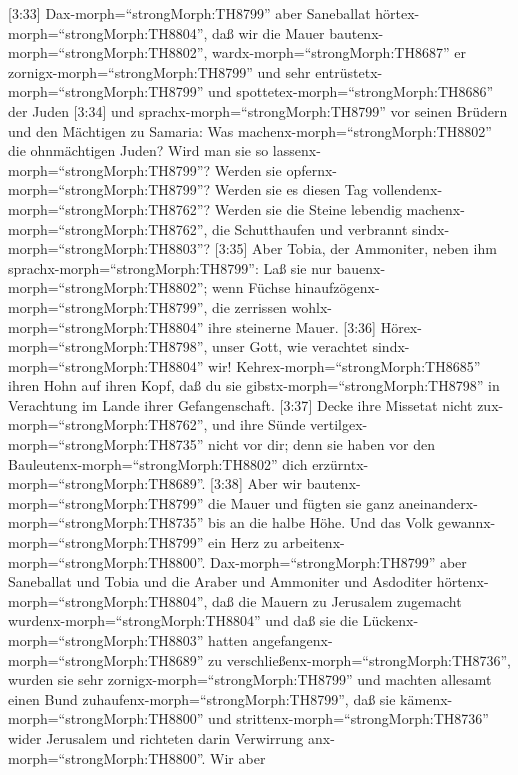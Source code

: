  {[}3:33{]} Dax-morph=``strongMorph:TH8799'' aber Saneballat
hörtex-morph=``strongMorph:TH8804'', daß wir die Mauer
bautenx-morph=``strongMorph:TH8802'', wardx-morph=``strongMorph:TH8687''
er zornigx-morph=``strongMorph:TH8799'' und sehr
entrüstetx-morph=``strongMorph:TH8799'' und
spottetex-morph=``strongMorph:TH8686'' der Juden  {[}3:34{]}
und sprachx-morph=``strongMorph:TH8799'' vor seinen Brüdern und den
Mächtigen zu Samaria: Was machenx-morph=``strongMorph:TH8802'' die
ohnmächtigen Juden? Wird man sie so
lassenx-morph=``strongMorph:TH8799''? Werden sie
opfernx-morph=``strongMorph:TH8799''? Werden sie es diesen Tag
vollendenx-morph=``strongMorph:TH8762''? Werden sie die Steine lebendig
machenx-morph=``strongMorph:TH8762'', die Schutthaufen und verbrannt
sindx-morph=``strongMorph:TH8803''?  {[}3:35{]} Aber Tobia,
der Ammoniter, neben ihm sprachx-morph=``strongMorph:TH8799'': Laß sie
nur bauenx-morph=``strongMorph:TH8802''; wenn Füchse
hinaufzögenx-morph=``strongMorph:TH8799'', die zerrissen
wohlx-morph=``strongMorph:TH8804'' ihre steinerne Mauer. 
{[}3:36{]} Hörex-morph=``strongMorph:TH8798'', unser Gott, wie verachtet
sindx-morph=``strongMorph:TH8804'' wir!
Kehrex-morph=``strongMorph:TH8685'' ihren Hohn auf ihren Kopf, daß du
sie gibstx-morph=``strongMorph:TH8798'' in Verachtung im Lande ihrer
Gefangenschaft.  {[}3:37{]} Decke ihre Missetat nicht
zux-morph=``strongMorph:TH8762'', und ihre Sünde
vertilgex-morph=``strongMorph:TH8735'' nicht vor dir; denn sie haben vor
den Bauleutenx-morph=``strongMorph:TH8802'' dich
erzürntx-morph=``strongMorph:TH8689''.  {[}3:38{]} Aber wir
bautenx-morph=``strongMorph:TH8799'' die Mauer und fügten sie ganz
aneinanderx-morph=``strongMorph:TH8735'' bis an die halbe Höhe. Und das
Volk gewannx-morph=``strongMorph:TH8799'' ein Herz zu
arbeitenx-morph=``strongMorph:TH8800''. 
Dax-morph=``strongMorph:TH8799'' aber Saneballat und Tobia und die
Araber und Ammoniter und Asdoditer hörtenx-morph=``strongMorph:TH8804'',
daß die Mauern zu Jerusalem zugemacht
wurdenx-morph=``strongMorph:TH8804'' und daß sie die
Lückenx-morph=``strongMorph:TH8803'' hatten
angefangenx-morph=``strongMorph:TH8689'' zu
verschließenx-morph=``strongMorph:TH8736'', wurden sie sehr
zornigx-morph=``strongMorph:TH8799''  und machten allesamt
einen Bund zuhaufenx-morph=``strongMorph:TH8799'', daß sie
kämenx-morph=``strongMorph:TH8800'' und
strittenx-morph=``strongMorph:TH8736'' wider Jerusalem und richteten
darin Verwirrung anx-morph=``strongMorph:TH8800''.  Wir aber
